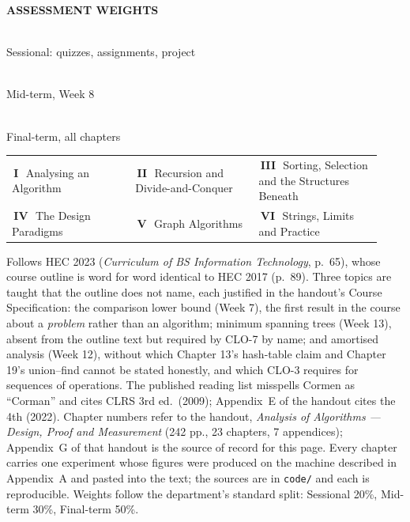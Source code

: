 \documentclass[10pt,a4paper]{article}
\makeatletter
\newcommand{\chipw}[2]{{\setlength{\fboxsep}{1.3pt}\colorbox{#1}{%
  \fontsize{6.4}{7}\selectfont\bfseries\color{white}\,#2\,}}}
\newcommand{\tile}[3]{{\colorbox{lightbg}{\parbox[c][0.9cm][c]{\dimexpr(\linewidth-3pt*\numexpr#1-1\relax)/#1-6pt-0.5pt\relax}{%
  \centering{\large\bfseries\color{primary}#2}\\[-0.5pt]{\fontsize{6.6}{7.4}\selectfont\color{sub}#3}}}}}
\newcommand{\legend}[6]{{\fontsize{6.6}{8}\selectfont\color{sub}%
  \begin{tabular}{@{}p{0.31\linewidth}p{0.31\linewidth}p{0.31\linewidth}@{}}
  \chipw{p1}{I}\ #1 & \chipw{p2}{II}\ #2 & \chipw{p3}{III}\ #3 \\[1pt]
  \chipw{p4}{IV}\ #4 & \chipw{p5}{V}\ #5 & \chipw{p6}{VI}\ #6
  \end{tabular}}}
\makeatother
\begin{document}
\vspace{4pt}
{\fontsize{6.6}{8}\selectfont\bfseries\color{neutral}\MakeUppercase{Assessment weights}}\\[2pt]
\tile{3}{20\%}{Sessional: quizzes, assignments, project}\hfill
\tile{3}{30\%}{Mid-term, Week 8}\hfill
\tile{3}{50\%}{Final-term, all chapters}

\vspace{3pt}
\legend{Analysing an Algorithm}{Recursion and Divide-and-Conquer}{Sorting, Selection and the Structures Beneath}
       {The Design Paradigms}{Graph Algorithms}{Strings, Limits and Practice}

\vspace{1pt}
{\fontsize{6.3}{7.6}\selectfont\color{neutral}%
Follows HEC 2023 (\emph{Curriculum of BS Information Technology}, p.\ 65), whose course outline is word for word identical to HEC 2017 (p.\ 89). Three topics are taught that the outline does not name, each justified in the handout's Course Specification: the comparison lower bound (Week 7), the first result in the course about a \emph{problem} rather than an algorithm; minimum spanning trees (Week 13), absent from the outline text but required by CLO-7 by name; and amortised analysis (Week 12), without which Chapter 13's hash-table claim and Chapter 19's union--find cannot be stated honestly, and which CLO-3 requires for sequences of operations. The published reading list misspells Cormen as ``Corman'' and cites CLRS 3rd ed.\ (2009); Appendix~E of the handout cites the 4th (2022). Chapter numbers refer to the handout, \emph{Analysis of Algorithms --- Design, Proof and Measurement} (242 pp., 23 chapters, 7 appendices); Appendix~G of that handout is the source of record for this page. Every chapter carries one experiment whose figures were produced on the machine described in Appendix~A and pasted into the text; the sources are in \texttt{code/} and each is reproducible.
Weights follow the department's standard split: Sessional 20\%, Mid-term 30\%, Final-term 50\%.\par}
\end{document}
